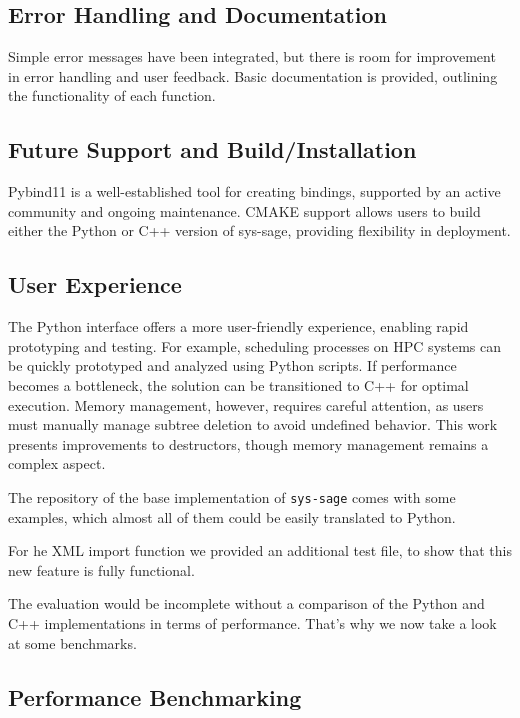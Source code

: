 \subsection{Error Handling and Documentation}

Simple error messages have been integrated, but there is room for improvement in error handling and user feedback. Basic documentation is provided, outlining the functionality of each function.

\subsection{Future Support and Build/Installation}

Pybind11 is a well-established tool for creating bindings, supported by an active community and ongoing maintenance. CMAKE support allows users to build either the Python or C++ version of sys-sage, providing flexibility in deployment.

\subsection{User Experience}

The Python interface offers a more user-friendly experience, enabling rapid prototyping and testing. For example, scheduling processes on HPC systems can be quickly prototyped and analyzed using Python scripts. If performance becomes a bottleneck, the solution can be transitioned to C++ for optimal execution. Memory management, however, requires careful attention, as users must manually manage subtree deletion to avoid undefined behavior. This work presents improvements to destructors, though memory management remains a complex aspect.

The repository of the base implementation of \texttt{sys-sage} comes with some examples, which almost all of them could be easily translated to Python.

For he XML import function we provided an additional test file, to show that this new feature is fully functional. 

The evaluation would be incomplete without a comparison of the Python and C++ implementations in terms of performance. That's why we now take a look at some benchmarks.

\subsection{Performance Benchmarking}

